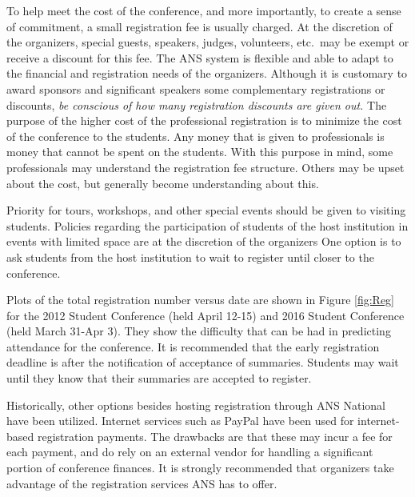 \documentclass[12pt]{article}
\begin{document}
To help meet the cost of the conference, and more importantly, to create a sense of commitment, a small registration fee is usually charged.
At the discretion of the organizers, special guests, speakers, judges, volunteers, etc.\ may be exempt or receive a discount for this fee.
The ANS system is flexible and able to adapt to the financial and registration needs of the organizers.
Although it is customary to award sponsors and significant speakers some complementary registrations or discounts, \emph{be conscious of how many registration discounts are given out.}
The purpose of the higher cost of the professional registration is to minimize the cost of the conference to the students.
Any money that is given to professionals is money that cannot be spent on the students.
With this purpose in mind, some professionals may understand the registration fee structure.
Others may be upset about the cost, but generally become understanding about this.

Priority for tours, workshops, and other special events should be given to visiting students.
Policies regarding the participation of students of the host institution in events with limited space are at the discretion of the organizers
One option is to ask students from the host institution to wait to register until closer to the conference.

Plots of the total registration number versus date are shown in Figure \ref{fig:Reg} for the 2012 Student Conference (held April 12-15) and 2016 Student Conference (held March 31-Apr 3).
They show the difficulty that can be had in predicting attendance for the conference.
It is recommended that the early registration deadline is after the notification of acceptance of summaries.
Students may wait until they know that their summaries are accepted to register.

Historically, other options besides hosting registration through ANS National have been utilized.
Internet services such as PayPal have been used for internet-based registration payments.
The drawbacks are that these may incur a fee for each payment, and do rely on an external vendor for handling a significant portion of conference finances.
It is strongly recommended that organizers take advantage of the registration services ANS has to offer.
\end{document}

